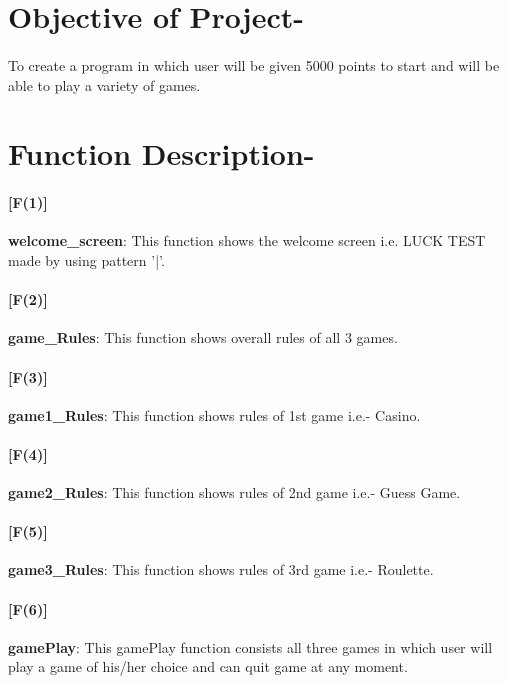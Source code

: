 \documentclass[]{article}
\title{}
\author{}
\date{}
\begin{document}
\vspace*{1mm}

\section{Objective of Project-}

\paragraph{}\large To create a program in which user will be given 5000 points to start and will be able to play a variety of games.

\vspace*{1mm}

\section{Function Description-}

\paragraph{[F(1)]}\textbf{welcome\_screen}:  This function shows the welcome screen i.e. LUCK TEST made by using pattern '|'.		
														
\paragraph{[F(2)]}\textbf{game\_Rules}:  This function shows overall rules of all 3 games.
												
\paragraph{[F(3)]}\textbf{game1\_Rules}:  This function shows rules of 1st game i.e.- Casino.					
				
\paragraph{[F(4)]}\textbf{game2\_Rules}:  This function shows rules of 2nd game i.e.- Guess Game.

\paragraph{[F(5)]}\textbf{game3\_Rules}:  This function shows rules of 3rd game i.e.- Roulette.

\paragraph{[F(6)]}\textbf{gamePlay}:  This gamePlay function consists all three games in which user will play a game of his/her choice and can quit game at any moment.
\end{document}
